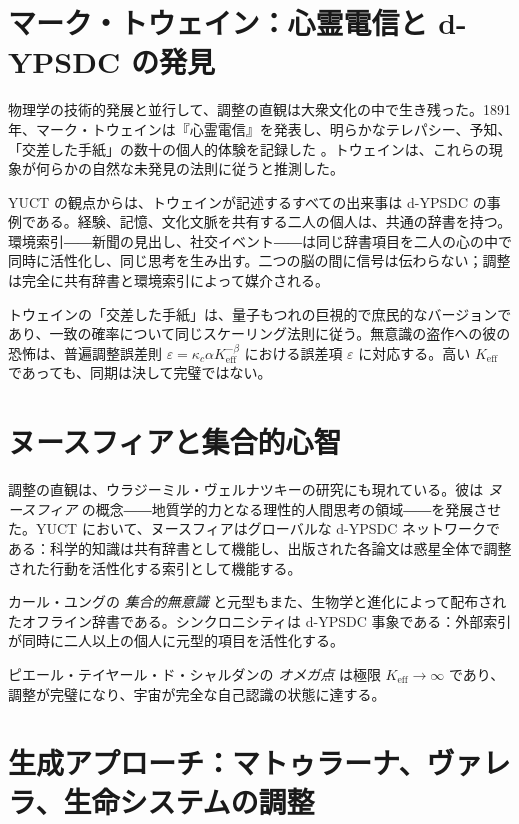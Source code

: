 \documentclass[12pt,a4paper]{article}
\begin{document}
	\section{マーク・トウェイン：心霊電信と d-YPSDC の発見}
	
	物理学の技術的発展と並行して、調整の直観は大衆文化の中で生き残った。1891年、マーク・トウェインは『心霊電信』を発表し、明らかなテレパシー、予知、「交差した手紙」の数十の個人的体験を記録した \cite{Twain1891}。トウェインは、これらの現象が何らかの自然な未発見の法則に従うと推測した。
	
	YUCT の観点からは、トウェインが記述するすべての出来事は d-YPSDC の事例である。経験、記憶、文化文脈を共有する二人の個人は、共通の辞書を持つ。環境索引――新聞の見出し、社交イベント――は同じ辞書項目を二人の心の中で同時に活性化し、同じ思考を生み出す。二つの脳の間に信号は伝わらない；調整は完全に共有辞書と環境索引によって媒介される。
	
	トウェインの「交差した手紙」は、量子もつれの巨視的で庶民的なバージョンであり、一致の確率について同じスケーリング法則に従う。無意識の盗作への彼の恐怖は、普遍調整誤差則 \(\varepsilon = \kappa_c \alpha K_{\mathrm{eff}}^{-\beta}\) における誤差項 \(\varepsilon\) に対応する。高い \(K_{\mathrm{eff}}\) であっても、同期は決して完璧ではない。
	
	\section{ヌースフィアと集合的心智}
	
	調整の直観は、ウラジーミル・ヴェルナツキーの研究にも現れている。彼は \emph{ヌースフィア} の概念――地質学的力となる理性的人間思考の領域――を発展させた。YUCT において、ヌースフィアはグローバルな d-YPSDC ネットワークである：科学的知識は共有辞書として機能し、出版された各論文は惑星全体で調整された行動を活性化する索引として機能する。
	
	カール・ユングの \emph{集合的無意識} と元型もまた、生物学と進化によって配布されたオフライン辞書である。シンクロニシティは d-YPSDC 事象である：外部索引が同時に二人以上の個人に元型的項目を活性化する。
	
	ピエール・テイヤール・ド・シャルダンの \emph{オメガ点} は極限 \(K_{\mathrm{eff}} \to \infty\) であり、調整が完璧になり、宇宙が完全な自己認識の状態に達する。
	
	\section{生成アプローチ：マトゥラーナ、ヴァレラ、生命システムの調整}
	
\end{document}
